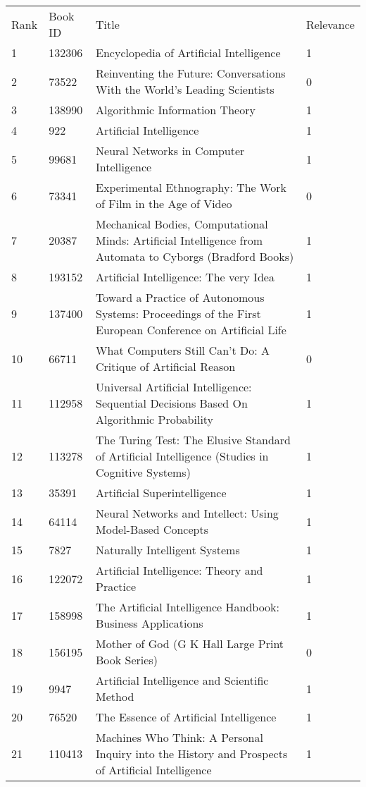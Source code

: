 \begin{tabular}{llll}
\toprule
\midrule
Rank & Book ID & Title & Relevance \\
1 & 132306 & Encyclopedia of Artificial Intelligence & 1 \\
2 & 73522 & Reinventing the Future: Conversations With the World's Leading Scientists & 0 \\
3 & 138990 & Algorithmic Information Theory & 1 \\
4 & 922 & Artificial Intelligence & 1 \\
5 & 99681 & Neural Networks in Computer Intelligence & 1 \\
6 & 73341 & Experimental Ethnography: The Work of Film in the Age of Video & 0 \\
7 & 20387 & Mechanical Bodies, Computational Minds: Artificial Intelligence from Automata to Cyborgs (Bradford Books) & 1 \\
8 & 193152 & Artificial Intelligence: The very Idea & 1 \\
9 & 137400 & Toward a Practice of Autonomous Systems: Proceedings of the First European Conference on Artificial Life & 1 \\
10 & 66711 & What Computers Still Can't Do: A Critique of Artificial Reason & 0 \\
11 & 112958 & Universal Artificial Intelligence: Sequential Decisions Based On Algorithmic Probability & 1 \\
12 & 113278 & The Turing Test: The Elusive Standard of Artificial Intelligence (Studies in Cognitive Systems) & 1 \\
13 & 35391 & Artificial Superintelligence & 1 \\
14 & 64114 & Neural Networks and Intellect: Using Model-Based Concepts & 1 \\
15 & 7827 & Naturally Intelligent Systems & 1 \\
16 & 122072 & Artificial Intelligence: Theory and Practice & 1 \\
17 & 158998 & The Artificial Intelligence Handbook: Business Applications & 1 \\
18 & 156195 & Mother of God (G K Hall Large Print Book Series) & 0 \\
19 & 9947 & Artificial Intelligence and Scientific Method & 1 \\
20 & 76520 & The Essence of Artificial Intelligence & 1 \\
21 & 110413 & Machines Who Think: A Personal Inquiry into the History and Prospects of Artificial Intelligence & 1 \\

\end{tabular}

